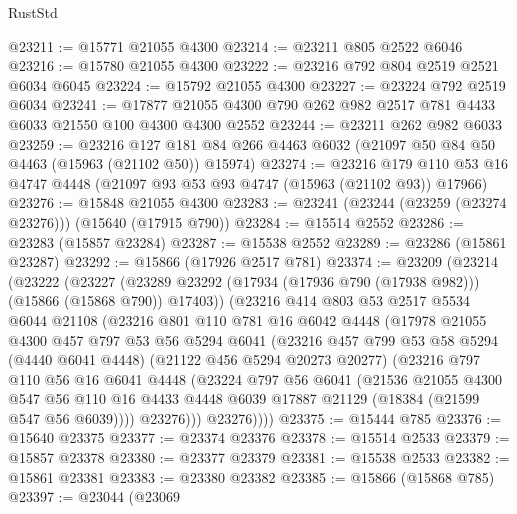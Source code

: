 \begin{lexlean}{RustStd}
\begin{coremodule}
@23211 := @15771 @21055 @4300
@23214 := @23211 @805 @2522 @6046
@23216 := @15780 @21055 @4300
@23222 := @23216 @792 @804 @2519 @2521 @6034 @6045
@23224 := @15792 @21055 @4300
@23227 := @23224 @792 @2519 @6034
@23241 := @17877 @21055 @4300 @790 @262 @982 @2517 @781 @4433 @6033 @21550 @100 @4300 @4300 @2552
@23244 := @23211 @262 @982 @6033
@23259 := @23216
    @127
    @181
    @84
    @266
    @4463
    @6032
    (@21097 @50 @84 @50 @4463 (@15963 (@21102 @50)) @15974)
@23274 := @23216
    @179
    @110
    @53
    @16
    @4747
    @4448
    (@21097 @93 @53 @93 @4747 (@15963 (@21102 @93)) @17966)
@23276 := @15848 @21055 @4300
@23283 := @23241 (@23244 (@23259 (@23274 @23276))) (@15640 (@17915 @790))
@23284 := @15514 @2552
@23286 := @23283 (@15857 @23284)
@23287 := @15538 @2552
@23289 := @23286 (@15861 @23287)
@23292 := @15866 (@17926 @2517 @781)
@23374 := @23209
    (@23214
      (@23222
        (@23227 (@23289 @23292 (@17934 (@17936 @790 (@17938 @982))) (@15866 (@15868 @790)) @17403))
        (@23216
          @414
          @803
          @53
          @2517
          @5534
          @6044
          @21108
          (@23216
            @801
            @110
            @781
            @16
            @6042
            @4448
            (@17978
              @21055
              @4300
              @457
              @797
              @53
              @56
              @5294
              @6041
              (@23216
                @457
                @799
                @53
                @58
                @5294
                (@4440 @6041 @4448)
                (@21122 @456 @5294 @20273 @20277)
                (@23216
                  @797
                  @110
                  @56
                  @16
                  @6041
                  @4448
                  (@23224
                    @797
                    @56
                    @6041
                    (@21536
                      @21055
                      @4300
                      @547
                      @56
                      @110
                      @16
                      @4433
                      @4448
                      @6039
                      @17887
                      @21129
                      (@18384 (@21599 @547 @56 @6039))))
                  @23276)))
            @23276))))
@23375 := @15444 @785
@23376 := @15640 @23375
@23377 := @23374 @23376
@23378 := @15514 @2533
@23379 := @15857 @23378
@23380 := @23377 @23379
@23381 := @15538 @2533
@23382 := @15861 @23381
@23383 := @23380 @23382
@23385 := @15866 (@15868 @785)
@23397 := @23044
    (@23069

\end{coremodule}
\end{lexlean}
